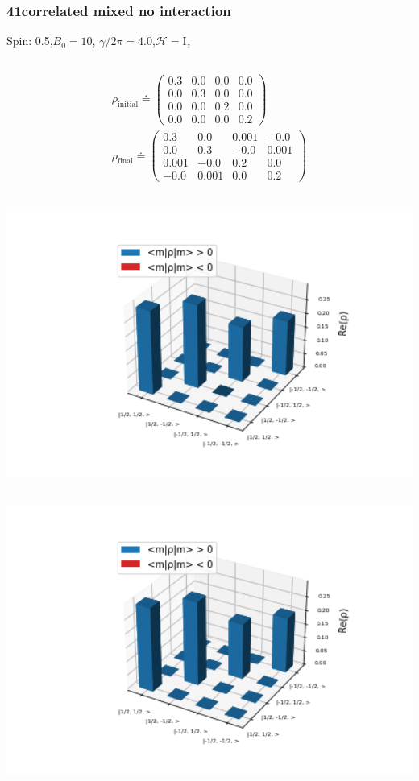 \documentclass[10pt]{beamer}
\begin{document}
\begin{frame}
\frametitle{41correlated mixed no interaction}
Spin: 0.5,$B_0= 10$, $\gamma/2\pi = 4.0$,$\mathcal{H}=\text{I}_{z}$
\begin{columns}[T]
\begin{column}{.5\textwidth}
\begin{align*}
\rho_{\text{initial}}\doteq
\begin{pmatrix}
0.3 & 0.0 & 0.0 & 0.0 \\
0.0 & 0.3 & 0.0 & 0.0 \\
0.0 & 0.0 & 0.2 & 0.0 \\
0.0 & 0.0 & 0.0 & 0.2
\end{pmatrix}
\\
\rho_{\text{final}}\doteq
\begin{pmatrix}
0.3 & 0.0 & 0.001 & -0.0 \\
0.0 & 0.3 & -0.0 & 0.001 \\
0.001 & -0.0 & 0.2 & 0.0 \\
-0.0 & 0.001 & 0.0 & 0.2
\end{pmatrix}
\end{align*}
\begin{column}{.5\textwidth}
\includegraphics[width=1.5\textwidth]{./spin1-2/41correlated_mixed_no_interaction/InitialRealPartDensityMatrix.png}
\end{column}
\begin{column}{.5\textwidth}
\includegraphics[width=1.5\textwidth]{./spin1-2/41correlated_mixed_no_interaction/EvolvedRealPartDensityMatrix.png}

\end{column}
\end{column}
\end{columns}
\end{frame}
\end{document}
